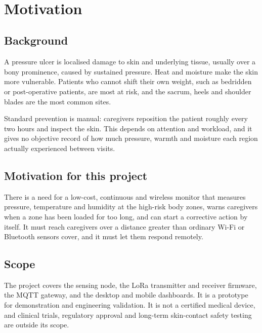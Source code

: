 \begin{center}
{\huge\textbf{\ttitle}}\\
\end{center}

\section{Motivation}

\subsection{Background}
A pressure ulcer is localised damage to skin and underlying tissue, usually over a bony prominence, caused by sustained pressure. Heat and moisture make the skin more vulnerable. Patients who cannot shift their own weight, such as bedridden or post-operative patients, are most at risk, and the sacrum, heels and shoulder blades are the most common sites.

Standard prevention is manual: caregivers reposition the patient roughly every two hours and inspect the skin. This depends on attention and workload, and it gives no objective record of how much pressure, warmth and moisture each region actually experienced between visits.

\subsection{Motivation for this project}
There is a need for a low-cost, continuous and wireless monitor that measures pressure, temperature and humidity at the high-risk body zones, warns caregivers when a zone has been loaded for too long, and can start a corrective action by itself. It must reach caregivers over a distance greater than ordinary Wi-Fi or Bluetooth sensors cover, and it must let them respond remotely.

\subsection{Scope}
The project covers the sensing node, the LoRa transmitter and receiver firmware, the MQTT gateway, and the desktop and mobile dashboards. It is a prototype for demonstration and engineering validation. It is not a certified medical device, and clinical trials, regulatory approval and long-term skin-contact safety testing are outside its scope.

